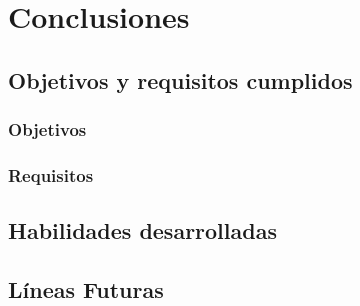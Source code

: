 \chapter{Conclusiones}
\label{cap:capitulo7}

\section{Objetivos y requisitos cumplidos}
\label{sec:objetivos_y_requisitos}

\subsection{Objetivos}
\label{subsec:objetivos}


\subsection{Requisitos}
\label{subsec:requisitos}


\section{Habilidades desarrolladas}
\label{sec:habilidades_desarrolladas}


\section{Líneas Futuras}
\label{sec:lineas_futuras}
